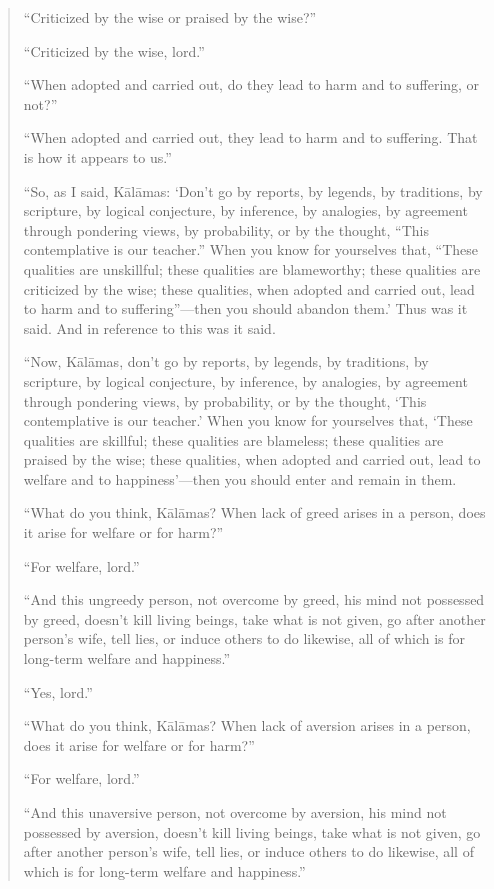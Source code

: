 \begin{quotation}
“Criticized by the wise or praised by the wise?”

“Criticized by the wise, lord.”

“When adopted and carried out, do they lead to harm and to suffering, or
not?”

“When adopted and carried out, they lead to harm and to suffering. That
is how it appears to us.”

“So, as I said, Kālāmas: ‘Don’t go by reports, by legends, by
traditions, by scripture, by logical conjecture, by inference, by
analogies, by agreement through pondering views, by probability, or by
the thought, “This contemplative is our teacher.” When you know for
yourselves that, “These qualities are unskillful; these qualities are
blameworthy; these qualities are criticized by the wise; these
qualities, when adopted and carried out, lead to harm and to
suffering”—then you should abandon them.’ Thus was it said. And in
reference to this was it said.

“Now, Kālāmas, don’t go by reports, by legends, by traditions, by
scripture, by logical conjecture, by inference, by analogies, by
agreement through pondering views, by probability, or by the thought,
‘This contemplative is our teacher.’ When you know for yourselves that,
‘These qualities are skillful; these qualities are blameless; these
qualities are praised by the wise; these qualities, when adopted and
carried out, lead to welfare and to happiness’—then you should enter and
remain in them.

“What do you think, Kālāmas? When lack of greed arises in a person, does
it arise for welfare or for harm?”

“For welfare, lord.”

“And this ungreedy person, not overcome by greed, his mind not possessed
by greed, doesn’t kill living beings, take what is not given, go after
another person’s wife, tell lies, or induce others to do likewise, all
of which is for long-term welfare and happiness.”

“Yes, lord.”

“What do you think, Kālāmas? When lack of aversion arises in a person,
does it arise for welfare or for harm?”

“For welfare, lord.”

“And this unaversive person, not overcome by aversion, his mind not
possessed by aversion, doesn’t kill living beings, take what is not
given, go after another person’s wife, tell lies, or induce others to do
likewise, all of which is for long-term welfare and happiness.”


\end{quotation}
